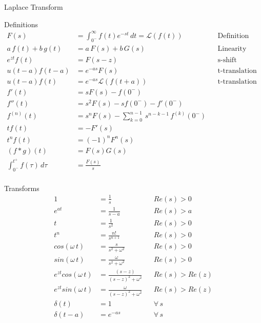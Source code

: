 %
%
%

\begin{section}{Laplace Transform}
  \begin{subsection}{Definitions}
    \begin{align*}
      F(s) &= \int_{0^-}^{\infty}f(t)e^{-st}\,dt = \mathcal{L}(f(t))
           && \text{Definition}\\
      a\,f(t) + b\,g(t) &= a\,F(s) + b\,G(s)  && \text{Linearity}\\
      e^{zt}f(t)&= F(s-z) && \text{s-shift} \\
      u(t-a)f(t-a)&= e^{-as}F(s) && \text{t-translation I} \\
      u(t-a)f(t)&= e^{-as}\mathcal{L}(f(t+a)) && \text{t-translation II} \\
      f'(t) &= sF(s) - f(0^{-}) \\
      f''(t) &= s^{2}F(s) - sf(0^{-}) - f'(0^{-}) \\
      f^{(n)}(t) &= s^{n}F(s) - \sum_{k=0}^{n-1}\,s^{n-k-1}\,f^{(k)}(0^{-}) \\
      tf(t) &= -F'(s) \\
      t^{n}f(t) &= (-1)^{n}F^{n}(s) \\
      (f*g)(t)&= F(s)G(s) \\
      \int_{0^-}^{t^+} f(\tau)\,d\tau &= \frac{F(s)}{s} \\
    \end{align*}
  \end{subsection}
  \begin{subsection}{Transforms}
    \begin{align*}
      1 &= \frac{1}{s} && Re(s) > 0\\
      e^{at} &= \frac{1}{s-a} && Re(s) > a\\
      t &= \frac{1}{s^2} && Re(s) > 0\\
      t^n &= \frac{n!}{s^{n+1}} && Re(s) > 0\\
      cos(\omega\,t) &= \frac{s}{s^2+\omega^2} && Re(s) > 0\\
      sin(\omega\,t) &= \frac{\omega}{s^2+\omega^2} && Re(s) > 0\\
      e^{zt}cos(\omega\,t) &= \frac{(s-z)}{(s-z)^2+\omega^2} && Re(s) > Re(z)\\
      e^{zt}sin(\omega\,t) &= \frac{\omega}{(s-z)^2+\omega^2} && Re(s) > Re(z)\\
      \delta(t) &= 1 && \forall\,s\\
      \delta(t-a) &= e^{-as} && \forall\,s\\

\end{align*}
\end{subsection}
\end{section}
